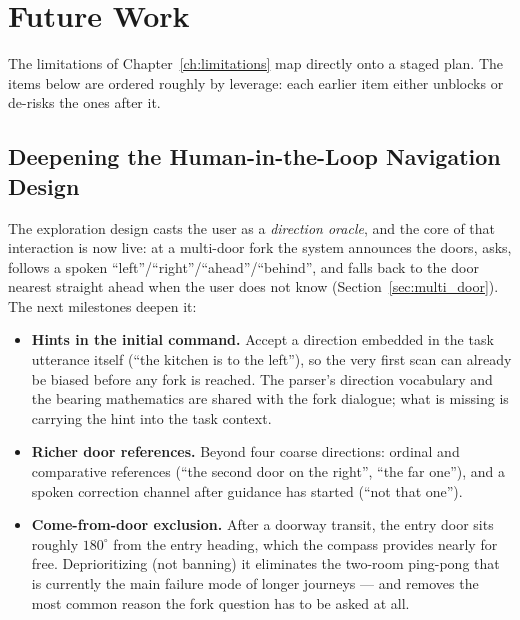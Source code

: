\chapter{Future Work}
\label{ch:future_work}

The limitations of Chapter~\ref{ch:limitations} map directly onto a staged plan.
The items below are ordered roughly by leverage: each earlier item either unblocks
or de-risks the ones after it.

\section{Deepening the Human-in-the-Loop Navigation Design}
\label{sec:fw_hints}

The exploration design casts the user as a \emph{direction oracle}, and the core
of that interaction is now live: at a multi-door fork the system announces the
doors, asks, follows a spoken ``left''/``right''/``ahead''/``behind'', and falls
back to the door nearest straight ahead when the user does not know
(Section~\ref{sec:multi_door}). The next milestones deepen it:

\begin{itemize}[nosep]
  \item \textbf{Hints in the initial command.} Accept a direction embedded in the
        task utterance itself (``the kitchen is to the left''), so the very first
        scan can already be biased before any fork is reached. The parser's
        direction vocabulary and the bearing mathematics are shared with the fork
        dialogue; what is missing is carrying the hint into the task context.
  \item \textbf{Richer door references.} Beyond four coarse directions: ordinal
        and comparative references (``the second door on the right'', ``the far
        one''), and a spoken correction channel after guidance has started
        (``not that one'').
  \item \textbf{Come-from-door exclusion.} After a doorway transit, the entry
        door sits roughly $180^\circ$ from the entry heading, which the compass
        provides nearly for free. Deprioritizing (not banning) it eliminates the
        two-room ping-pong that is currently the main failure mode of longer
        journeys --- and removes the most common reason the fork question has to
        be asked at all.
\end{itemize}

